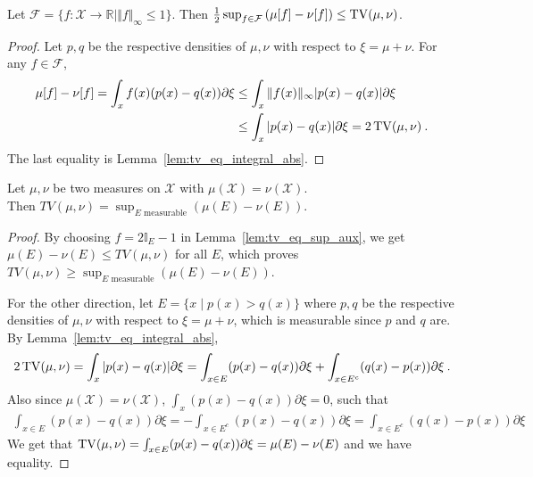 \begin{lemma}
  \label{lem:tv_eq_sup_aux}
  Let $\mathcal F = \{f : \mathcal X \to \mathbb{R} \mid \Vert f \Vert_\infty \le 1\}$.
  Then $\frac{1}{2} \sup_{f \in \mathcal F} \left( \mu[f] - \nu[f] \right) \le \operatorname{TV}(\mu, \nu)$.
\end{lemma}

\begin{proof}
Let $p,q$ be the respective densities of $\mu, \nu$ with respect to $\xi=\mu+\nu$.
For any $f \in \mathcal F$,
\begin{align*}
\mu[f] - \nu[f]
= \int_x f(x)(p(x) - q(x)) \partial\xi
&\le \int_x \Vert f(x) \Vert_\infty \vert p(x) - q(x) \vert \partial\xi
\\
&\le \int_x \vert p(x) - q(x) \vert \partial\xi
= 2 \operatorname{TV}(\mu, \nu)
\: .
\end{align*}
The last equality is Lemma~\ref{lem:tv_eq_integral_abs}.
\end{proof}

\begin{theorem}
  \label{thm:tv_eq_sup_sub_measure}
  Let $\mu, \nu$ be two measures on $\mathcal X$ with $\mu(\mathcal X) = \nu(\mathcal X)$.\\
  Then $TV(\mu, \nu) = \sup_{E \text{ measurable}} \left( \mu(E) - \nu(E) \right)$.
\end{theorem}

\begin{proof}
By choosing $f = 2 \mathbb{I}_E - 1$ in Lemma~\ref{lem:tv_eq_sup_aux}, we get $\mu(E) - \nu(E) \le TV(\mu, \nu)$ for all $E$, which proves
$TV(\mu, \nu) \ge \sup_{E \text{ measurable}} \left( \mu(E) - \nu(E) \right)$.

For the other direction, let $E = \{x \mid p(x) > q(x)\}$ where $p,q$ be the respective densities of $\mu, \nu$ with respect to $\xi=\mu+\nu$, which is measurable since $p$ and $q$ are. By Lemma~\ref{lem:tv_eq_integral_abs},
\begin{align*}
2\operatorname{TV}(\mu, \nu)
= \int_x \vert p(x) - q(x) \vert \partial \xi
= \int_{x \in E} (p(x) - q(x)) \partial \xi + \int_{x \in E^c} (q(x) - p(x)) \partial \xi
\: .
\end{align*}
Also since $\mu(\mathcal X) = \nu(\mathcal X)$, $\int_x (p(x) - q(x)) \partial \xi = 0$, such that
\begin{align*}
\int_{x \in E} (p(x) - q(x)) \partial \xi
= - \int_{x \in E^c} (p(x) - q(x)) \partial \xi
= \int_{x \in E^c} (q(x) - p(x)) \partial \xi
\end{align*}
We get that $\operatorname{TV}(\mu, \nu) = \int_{x \in E} (p(x) - q(x)) \partial \xi = \mu(E) - \nu(E)$ and we have equality.
\end{proof}

